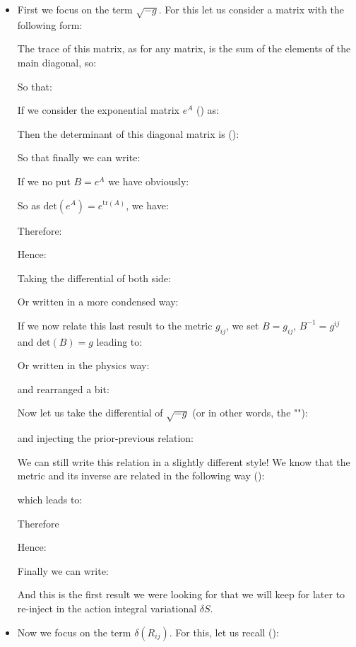 	\begin{itemize}
		\item First we focus on the term $\sqrt{-g}$. For this let us consider a matrix with the following form:
		
		The trace of this matrix, as for any matrix, is the sum of the elements of the main diagonal, so:
		
		So that:
		
		If we consider the exponential matrix $e^A$ () as:
		
		Then the determinant of this diagonal matrix is ():
		
		So that finally we can write:
		
		If we no put $B=e^A$ we have obviously:
		
		So as $\text{det}(e^A)=e^{\text{tr}(A)}$, we have:
		
		Therefore:
		
		Hence:
		
		Taking the differential of both side:
		
		Or written in a more condensed way:
		
		If we now relate this last result to the metric $g_{ij}$, we set $B=g_{ij}$, $B^{-1}=g^{ij}$ and $\text{det}(B)=g$ leading to:
		
		Or written in the physics way:
		
		and rearranged a bit:
		
		Now let us take the differential of $\sqrt{-g}$ (or in other words, the ""):
		
		and injecting the prior-previous relation:
		
		We can still write this relation in a slightly different style! We know that the metric and its inverse are related in the following way ():
		
		which leads to:
		
		Therefore
		
		Hence:
		
		Finally we can write:
		
		And this is the first result we were looking for that we will keep for later to re-inject in the action integral variational $\delta S$.
		
		\item Now we focus on the term $\delta(R_{ij})$. For this, let us recall ():
	

\end{itemize}
